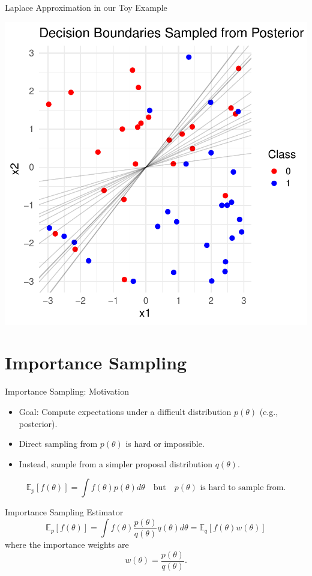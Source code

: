\documentclass{beamer}
\begin{document}
\begin{frame}{Laplace Approximation in our Toy Example}

\begin{center}
  \includegraphics[width=0.6\linewidth]{figures/laplace_decision_boundaries.pdf}
\end{center}

\end{frame}

\section{Importance Sampling}
\begin{frame}{Importance Sampling: Motivation}
\begin{itemize}
    \item Goal: Compute expectations under a difficult distribution \( p(\theta) \) (e.g., posterior).
    \item Direct sampling from \( p(\theta) \) is hard or impossible.
    \item Instead, sample from a simpler proposal distribution \( q(\theta) \).
\end{itemize}
\[
\mathbb{E}_{p}[f(\theta)] = \int f(\theta) p(\theta) d\theta \quad \text{but} \quad p(\theta) \text{ is hard to sample from}.
\]
\end{frame}

\begin{frame}{Importance Sampling Estimator}
\[
\mathbb{E}_{p}[f(\theta)] = \int f(\theta) \frac{p(\theta)}{q(\theta)} q(\theta) d\theta = \mathbb{E}_{q}\left[f(\theta) w(\theta)\right]
\]
where the \alert{importance weights} are
\[
w(\theta) = \frac{p(\theta)}{q(\theta)}.
\]
\end{frame}
\end{document}
